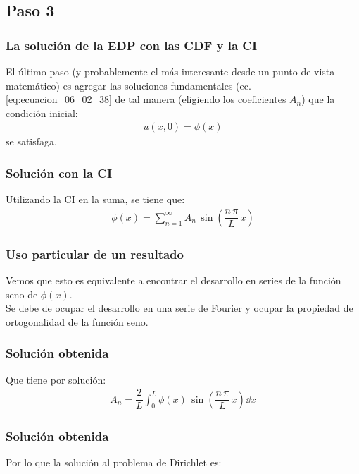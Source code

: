 \documentclass[12pt]{beamer}
\newcommand*\widefbox[1]{\fbox{\hspace{2em}#1\hspace{2em}}}
\begin{document}
\subsection{Paso 3}
\begin{frame}
\frametitle{La solución de la EDP con las CDF y la CI}
El último paso (y probablemente el más interesante desde un punto de vista matemático) es agregar las soluciones fundamentales (ec. \ref{eq:ecuacion_06_02_38} de tal manera (eligiendo los coeficientes $A_{n}$) que la condición inicial:
\begin{align*}
u(x, 0) = \phi (x)
\end{align*}
se satisfaga.
\end{frame}
\begin{frame}
\frametitle{Solución con la CI}
Utilizando la CI en la suma, se tiene que:
\begin{align*}
\phi (x) = \sum_{n=1}^{\infty} A_{n} \, \sin \left( \dfrac{n \, \pi}{L} \, x \right)
\end{align*}
\end{frame}
\begin{frame}
\frametitle{Uso particular de un resultado}
Vemos que esto es equivalente a encontrar el desarrollo en series de la función seno de $\phi (x)$.
\\
\bigskip
Se debe de ocupar el desarrollo en una serie de Fourier y ocupar la propiedad de ortogonalidad de la función seno.
\end{frame}
\begin{frame}
\frametitle{Solución obtenida}
Que tiene por solución:
\begin{align}
A_{n} = \dfrac{2}{L} \int_{0}^{L} \phi (x) \, \sin \left( \dfrac{n \, \pi}{L} \, x \right) \dd{x}
\label{eq:ecuacion_06_02_40}    
\end{align}
\end{frame}
\begin{frame}
\frametitle{Solución obtenida}
Por lo que la solución al problema de Dirichlet es:
{\fontsize{12}{12}\selectfont
{}}
\end{frame}
\end{document}

